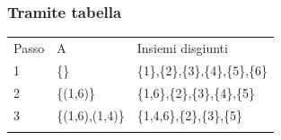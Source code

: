 \documentclass{article}
\begin{document}
{{{\subsubsection{Tramite tabella}

\protect\hypertarget{t.3d51b92c2ac905672959a85df610c27b5dc51a6c}{}{}\protect\hypertarget{t.43}{}{}

\begin{longtable}[]{@{}lll@{}}
\toprule
\begin{minipage}[t]{0.30\columnwidth}\raggedright\strut
{Passo}\strut
\end{minipage} & \begin{minipage}[t]{0.30\columnwidth}\raggedright\strut
{A}\strut
\end{minipage} & \begin{minipage}[t]{0.30\columnwidth}\raggedright\strut
{Insiemi disgiunti}\strut
\end{minipage}\tabularnewline
\begin{minipage}[t]{0.30\columnwidth}\raggedright\strut
{1}\strut
\end{minipage} & \begin{minipage}[t]{0.30\columnwidth}\raggedright\strut
{\{\}}\strut
\end{minipage} & \begin{minipage}[t]{0.30\columnwidth}\raggedright\strut
{\{1\},\{2\},\{3\},\{4\},\{5\},\{6\}}\strut
\end{minipage}\tabularnewline
\begin{minipage}[t]{0.30\columnwidth}\raggedright\strut
{2}\strut
\end{minipage} & \begin{minipage}[t]{0.30\columnwidth}\raggedright\strut
{\{(1,6)\}}\strut
\end{minipage} & \begin{minipage}[t]{0.30\columnwidth}\raggedright\strut
{\{1,6\},\{2\},\{3\},\{4\},\{5\}}\strut
\end{minipage}\tabularnewline
\begin{minipage}[t]{0.30\columnwidth}\raggedright\strut
{3}\strut
\end{minipage} & \begin{minipage}[t]{0.30\columnwidth}\raggedright\strut
{\{(1,6),(1,4)\}}\strut
\end{minipage} & \begin{minipage}[t]{0.30\columnwidth}\raggedright\strut
{\{1,4,6\},\{2\},\{3\},\{5\}}\strut
\end{minipage}\tabularnewline
\begin{minipage}[t]{0.30\columnwidth}\raggedright\strut

\end{minipage}
\end{longtable}}}}
\end{document}
